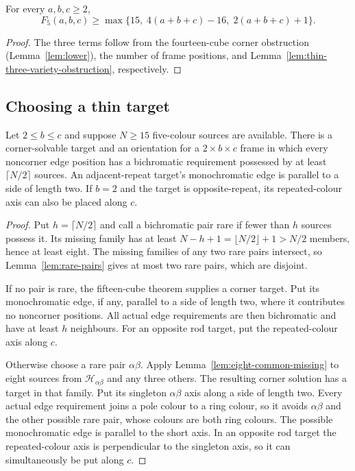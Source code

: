\begin{proposition}\label{cor:all-lower-bounds}
For every $a,b,c\ge2$,
\[
 F_5(a,b,c)\ge\max\{15,\;4(a+b+c)-16,\;2(a+b+c)+1\}.
\]
\end{proposition}
\begin{proof}
The three terms follow from the fourteen-cube corner obstruction (Lemma~\ref{lem:lower}),
the number of frame positions, and
Lemma~\ref{lem:thin-three-variety-obstruction}, respectively.
\end{proof}

\subsection{Choosing a thin target}

\begin{lemma}\label{lem:thin-target}
Let $2\le b\le c$ and suppose $N\ge15$ five-colour sources are available.
There is a corner-solvable target and an orientation for a $2\times b\times c$
frame in which every noncorner edge position has a bichromatic requirement
possessed by at least $\lceil N/2\rceil$ sources. An adjacent-repeat target's
monochromatic edge is parallel to a side of length two. If $b=2$ and the
target is opposite-repeat, its repeated-colour axis can also be placed along $c$.
\end{lemma}
\begin{proof}
Put $h=\lceil N/2\rceil$ and call a bichromatic pair rare if fewer than $h$
sources possess it. Its missing family has at least
$N-h+1=\lfloor N/2\rfloor+1>N/2$ members, hence at least eight.
The missing families of any two rare pairs intersect, so
Lemma~\ref{lem:rare-pairs} gives at most two rare pairs, which are disjoint.

If no pair is rare, the fifteen-cube theorem supplies a corner target.
Put its monochromatic edge, if any, parallel to a side of length two,
where it contributes no noncorner positions. All actual edge requirements
are then bichromatic and have at least $h$ neighbours. For an opposite
rod target, put the repeated-colour axis along $c$.

Otherwise choose a rare pair $\alpha\beta$. Apply
Lemma~\ref{lem:eight-common-missing} to eight sources from
$\mathcal H_{\alpha\beta}$ and any three others. The resulting corner
solution has a target in that family. Put its singleton $\alpha\beta$
axis along a side of length two. Every actual edge requirement joins a
pole colour to a ring colour, so it avoids $\alpha\beta$ and the other
possible rare pair, whose colours are both ring colours. The possible
monochromatic edge is parallel to the short axis. In an opposite rod
target the repeated-colour axis is perpendicular to the singleton axis,
so it can simultaneously be put along $c$.
\end{proof}

